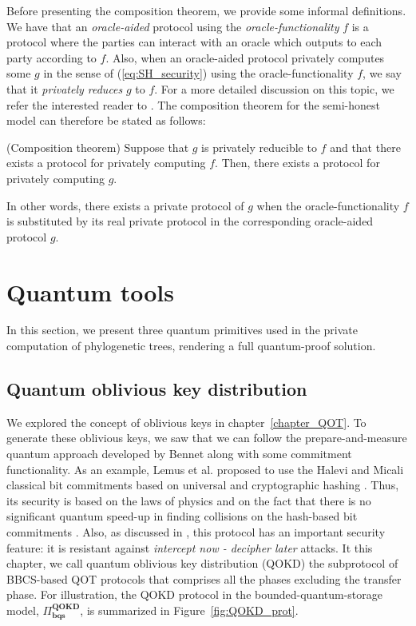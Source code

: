 Before presenting the composition theorem, we provide some informal definitions. We have that an \textit{oracle-aided} protocol using the \textit{oracle-functionality} $f$ is a protocol where the parties can interact with an oracle which outputs to each party according to $f$. Also, when an oracle-aided protocol privately computes some $g$ in the sense of (\ref{eq:SH_security}) using the oracle-functionality $f$, we say that it \textit{privately reduces} $g$ to $f$. For a more detailed discussion on this topic, we refer the interested reader to \cite{Goldreich98}. The composition theorem for the semi-honest model can therefore be stated as follows:

\begin{theorem}(Composition theorem)\label{compositionthm}
Suppose that $g$ is privately reducible to $f$ and that there exists a protocol for privately computing $f$. Then, there exists a protocol for privately computing $g$.
\end{theorem}

In other words, there exists a private protocol of $g$ when the oracle-functionality $f$ is substituted by its real private protocol in the corresponding oracle-aided protocol $g$.



\section{Quantum tools} \label{quantumTools}

In this section, we present three quantum primitives used in the private computation of phylogenetic trees, rendering a full quantum-proof solution.


\subsection{Quantum oblivious key distribution}

We explored the concept of oblivious keys in chapter~\ref{chapter_QOT}. To generate these oblivious keys, we saw that we can follow the prepare-and-measure quantum approach developed by Bennet \cite{BBCS92} along with some commitment functionality. As an example, Lemus et al. \cite{Lemus20} proposed to use the Halevi and Micali classical bit commitments based on universal and cryptographic hashing \cite{HM96}. Thus, its security is based on the laws of physics and on the fact that there is no significant quantum speed-up in finding collisions on the hash-based bit commitments \cite{Shi02, ABLST17, Lemus20}. Also, as discussed in \cite{Lemus20, SPM21}, this protocol has an important security feature: it is resistant against \textit{intercept now - decipher later} attacks. It this chapter, we call quantum oblivious key distribution (QOKD) the subprotocol of BBCS-based QOT protocols that comprises all the phases excluding the transfer phase. For illustration, the QOKD protocol in the bounded-quantum-storage model, $\Pi^{\textbf{QOKD}}_{\textbf{bqs}}$, is summarized in Figure~\ref{fig:QOKD_prot}.

